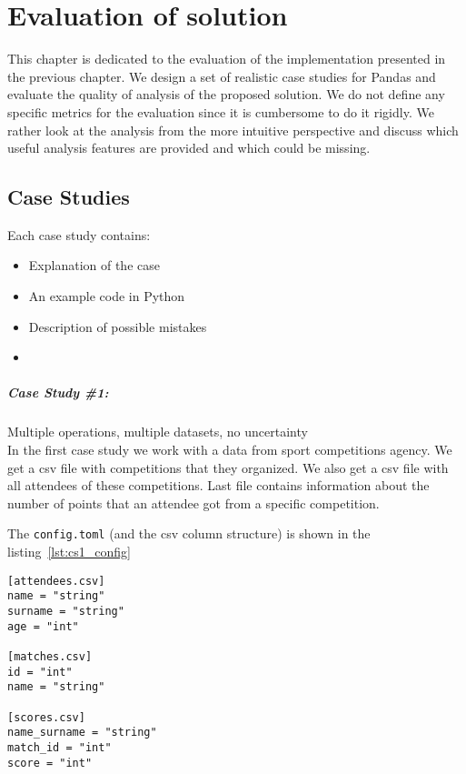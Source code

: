 \chapter{Evaluation of solution}

This chapter is dedicated to the evaluation of the implementation presented in the previous chapter.
We design a set of realistic case studies for Pandas and evaluate the quality of analysis of the proposed solution.
We do not define any specific metrics for the evaluation since it is cumbersome to do it rigidly.
We rather look at the analysis from the more intuitive perspective and discuss which useful analysis features are
provided and which could be missing.

\section{Case Studies}

Each case study contains:
\begin{itemize}
    \item Explanation of the case
    \item An example code in Python
    \item Description of possible mistakes
    \item
\end{itemize}

\paragraph{Case Study \#1:} Multiple operations, multiple datasets, no uncertainty  \\

In the first case study we work with a data from sport competitions agency.
We get a csv file with competitions that they organized.
We also get a csv file with all attendees of these competitions.
Last file contains information about the number of points that an attendee got from a specific competition.

The \verb|config.toml| (and the csv column structure) is shown in the listing~\ref{lst:cs1_config}

\begin{lstlisting}[caption=config.toml of the first case study, label={lst:cs1_config}, captionpos=b]
[attendees.csv]
name = "string"
surname = "string"
age = "int"

[matches.csv]
id = "int"
name = "string"

[scores.csv]
name_surname = "string"
match_id = "int"
score = "int"
\end{lstlisting}

